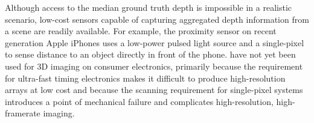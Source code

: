 







Although access to the median ground truth depth is impossible in a realistic
scenario, low-cost sensors capable of capturing aggregated depth information
from a scene are readily available. For example, the proximity sensor on recent
generation Apple iPhones uses a low-power pulsed light source and a
single-pixel  %
to sense distance to an
object directly in front of the phone. %
 have
not yet been used for 3D imaging on consumer electronics, primarily because the requirement for
ultra-fast timing electronics makes it difficult to produce high-resolution
arrays at low cost and because the scanning requirement for single-pixel
systems introduces a point of mechanical failure and complicates
high-resolution, high-framerate imaging.


